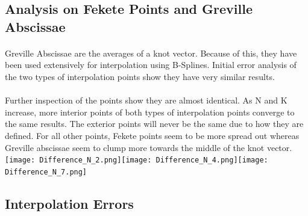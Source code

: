 \documentclass{article}
\begin{document}
\subsection*{Analysis on Fekete Points and Greville Abscissae}
\paragraph{}
Greville Abscissae are the averages of a knot vector. Because of this, they have been used extensively for interpolation using B-Splines. Initial error analysis of the two types of interpolation points show they have very similar results.
\paragraph{}
Further inspection of the points show they are almost identical. As N and K increase, more interior points of both types of interpolation points converge to the same results. The exterior points will never be the same due to how they are defined. For all other points, Fekete points seem to be more spread out whereas Greville abscissae seem to clump more towards the middle of the knot vector.
\hspace*{-1.75cm}\texttt{[image: Difference\_N\_2.png]}\texttt{[image: Difference\_N\_4.png]}\texttt{[image: Difference\_N\_7.png]}
\subsection*{Interpolation Errors}
\end{document}
